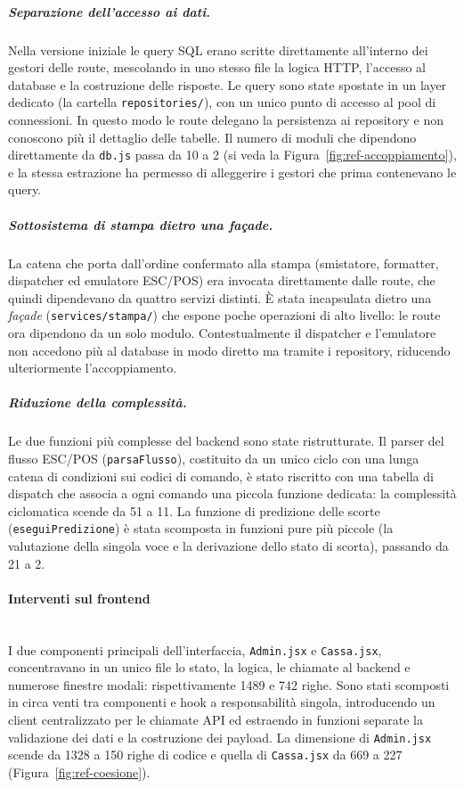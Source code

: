 \subparagraph{Separazione dell'accesso ai dati.}
Nella versione iniziale le query SQL erano scritte direttamente all'interno dei
gestori delle route, mescolando in uno stesso file la logica HTTP, l'accesso al
database e la costruzione delle risposte. Le query sono state spostate in un
layer dedicato (la cartella \texttt{repositories/}), con un unico punto di
accesso al pool di connessioni. In questo modo le route delegano la persistenza
ai repository e non conoscono più il dettaglio delle tabelle. Il numero di
moduli che dipendono direttamente da \texttt{db.js} passa da 10 a 2 (si veda la
Figura~\ref{fig:ref-accoppiamento}), e la stessa estrazione ha permesso di
alleggerire i gestori che prima contenevano le query.

\subparagraph{Sottosistema di stampa dietro una façade.}
La catena che porta dall'ordine confermato alla stampa (smistatore, formatter,
dispatcher ed emulatore ESC/POS) era invocata direttamente dalle route, che
quindi dipendevano da quattro servizi distinti. È stata incapsulata dietro una
\emph{façade} (\texttt{services/stampa/}) che espone poche operazioni di alto
livello: le route ora dipendono da un solo modulo. Contestualmente il dispatcher
e l'emulatore non accedono più al database in modo diretto ma tramite i
repository, riducendo ulteriormente l'accoppiamento.

\subparagraph{Riduzione della complessità.}
Le due funzioni più complesse del backend sono state ristrutturate. Il parser
del flusso ESC/POS (\texttt{parsaFlusso}), costituito da un unico ciclo con una
lunga catena di condizioni sui codici di comando, è stato riscritto con una
tabella di dispatch che associa a ogni comando una piccola funzione dedicata: la
complessità ciclomatica scende da 51 a 11. La funzione di predizione delle
scorte (\texttt{eseguiPredizione}) è stata scomposta in funzioni pure più piccole
(la valutazione della singola voce e la derivazione dello stato di scorta),
passando da 21 a 2.

\paragraph{Interventi sul frontend}\mbox{}\\
I due componenti principali dell'interfaccia, \texttt{Admin.jsx} e
\texttt{Cassa.jsx}, concentravano in un unico file lo stato, la logica, le
chiamate al backend e numerose finestre modali: rispettivamente 1489 e 742 righe.
Sono stati scomposti in circa venti tra componenti e hook a responsabilità
singola, introducendo un client centralizzato per le chiamate API ed estraendo
in funzioni separate la validazione dei dati e la costruzione dei payload. La
dimensione di \texttt{Admin.jsx} scende da 1328 a 150 righe di codice e quella di
\texttt{Cassa.jsx} da 669 a 227 (Figura~\ref{fig:ref-coesione}).

